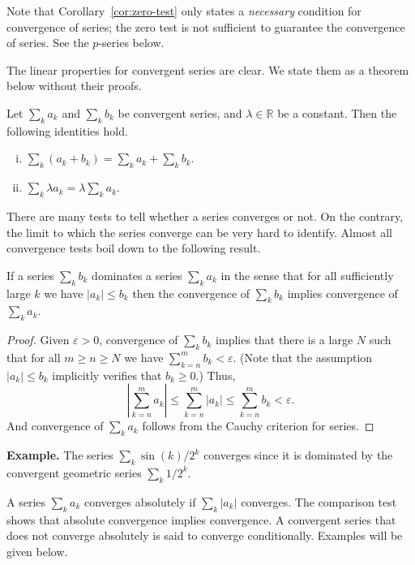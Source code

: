 \documentclass[11pt]{article}
\begin{document}
Note that Corollary~\ref{cor:zero-test} only states a \textit{necessary} condition for convergence of series; the zero test is not sufficient to guarantee the convergence of series.
See the $p$-series below.

The linear properties for convergent series are clear.
We state them as a theorem below without their proofs.
\begin{thm}
  Let $\sum_k a_k$ and $\sum_k b_k$ be convergent series, and $\lambda \in \mathbb{R}$ be a constant.  Then the following identities hold.
  \begin{enumerate}[(i)]
    \item $\displaystyle \sum_k (a_k + b_k) = \sum_k a_k + \sum_k b_k$.

    \item $\displaystyle \sum_k \lambda a_k = \lambda \sum_k a_k$.
  \end{enumerate}
\end{thm}

There are many tests to tell whether a series converges or not.
On the contrary, the limit to which the series converge can be very hard to identify.
Almost all convergence tests boil down to the following result.

\begin{thm}
  If a series $\sum_k b_k$ \textsf{dominates} a series $\sum_k a_k$ in the sense that for all sufficiently large $k$ we have $|a_k| \leqslant b_k$ then the convergence of $\sum_k b_k$ implies convergence of $\sum_k a_k$.
\end{thm}

\begin{proof}
  Given $\varepsilon > 0$, convergence of $\sum_k b_k$ implies that there is a large $N$ such that for all $m \geqslant n \geqslant N$ we have $\sum_{k=n}^m b_k < \varepsilon$.  (Note that the assumption $|a_k| \leqslant b_k$ implicitly verifies that $b_k \geqslant 0$.)
  Thus,
  \[
    \left| \sum_{k=n}^m a_k \right| \leqslant \sum_{k=n}^m |a_k| \leqslant \sum_{k=n}^m b_k < \varepsilon.
  \]
  And convergence of $\sum_k a_k$ follows from the Cauchy criterion for series.
\end{proof}

\noindent\textbf{Example.} The series $\sum_k \sin(k) / 2^k$ converges since it is dominated by the convergent geometric series $\sum_k 1/2^k$.

\medskip
A series $\sum_k a_k$ converges \textsf{absolutely} if $\sum_k |a_k|$ converges.
The comparison test shows that absolute convergence implies convergence.
A convergent series that does not converge absolutely is said to converge \textsf{conditionally}.
Examples will be given below.
\end{document}
